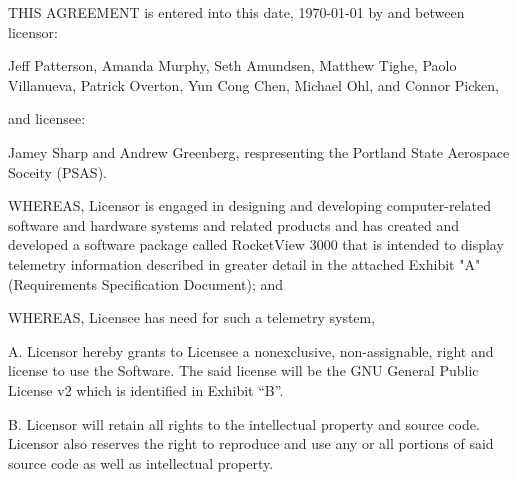 THIS AGREEMENT is entered into this date, {\today }  by and between licensor:
\bigskip

Jeff Patterson, Amanda Murphy, Seth Amundsen, Matthew Tighe, Paolo Villanueva, Patrick Overton, Yun Cong Chen, Michael Ohl, and Connor Picken, 

\bigskip 

and licensee: 

\bigskip

Jamey Sharp and Andrew Greenberg, respresenting the Portland State Aerospace Soceity (PSAS).

\bigskip

WHEREAS, Licensor is engaged in designing and developing computer-related software and hardware systems and related products and has created and developed a software package called RocketView 3000 that is intended to display telemetry information described in greater detail in the attached Exhibit "A" (Requirements Specification Document); and

\bigskip

WHEREAS, Licensee has need for such a telemetry system,
\bigskip

A. Licensor hereby grants to Licensee a nonexclusive, non-assignable, right and license to use the Software. The said license will be the GNU General Public License v2 which is identified in Exhibit ``B''.

\bigskip

B. Licensor will retain all rights to the intellectual property and source code. Licensor also reserves the right to reproduce and use any or all portions of said source code as well as intellectual property.

